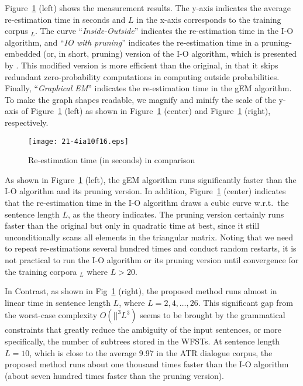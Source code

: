 \documentclass[english]{jnlp_1.4_rep}
\newcommand{\Vn}{}
\newcommand{\corpus}{}
\begin{document}
Figure~\ref{graph:1} (left) shows the measurement results.
The y-axis indicates the average re-estimation time in seconds and
$L$ in the x-axis corresponds to the training corpus $\corpus_L$.
The curve ``{\it Inside-Outside}'' indicates the re-estimation
time in the I-O algorithm, and ``{\it IO with pruning}''
indicates the re-estimation time in a pruning-embedded
(or, in short, pruning) version of the I-O algorithm, which is
presented by .
This modified version is more efficient than the original,
in that it skips redundant zero-probability computations
in computing outside probabilities.  Finally, ``{\it Graphical EM}''
indicates the re-estimation time in the gEM algorithm.
To make the graph shapes readable, we magnify and
minify the scale of the y-axis of Figure~\ref{graph:1} (left)
as shown in Figure~\ref{graph:1} (center) and Figure~\ref{graph:1}
(right), respectively.

\begin{figure}[b]
\begin{center}
\texttt{[image: 21-4ia10f16.eps]}
\end{center}
\caption{Re-estimation time (in seconds) in comparison}
\label{graph:1}
\end{figure}

As shown in Figure~\ref{graph:1} (left), the gEM algorithm runs
significantly faster than the I-O algorithm and its pruning version.
In addition, Figure~\ref{graph:1} (center) indicates that
the re-estimation time in the I-O algorithm draws
a cubic curve w.r.t.\ the sentence length $L$, as the theory
indicates.  The pruning version certainly runs
faster than the original but only in quadratic time
at best, since it still unconditionally scans all elements
in the triangular matrix.  Noting that we need to repeat
re-estimations several hundred times and conduct random restarts,
it is not practical to run the I-O algorithm or its pruning
version until convergence for the training corpora $\corpus_L$
where $L>20$.

In Contrast, as shown in Fig~\ref{graph:1} (right),
the proposed method runs almost in linear time in sentence length
$L$, where $L=2,4,\ldots, 26$.  This significant gap from the
worst-case complexity $O(|\Vn|^3 L^3)$ seems to be brought
by the grammatical constraints that greatly reduce the ambiguity
of the input sentences, or more specifically, the number of
subtrees stored in the WFSTs.  At sentence length $L=10$,
which is close to the average 9.97 in the ATR dialogue corpus,
the proposed method runs about one thousand times faster than
the I-O algorithm
(about seven hundred times faster than the pruning version).
\end{document}
